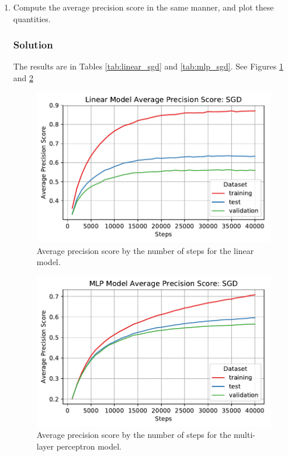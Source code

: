 \documentclass[letterpaper,11pt]{article}
\begin{document}
\begin{enumerate}
\item Compute the average precision score in the same manner, and plot these
  quantities.

  \subsubsection*{Solution}

  The results are in Tables \ref{tab:linear_sgd} and \ref{tab:mlp_sgd}. See
  Figures \ref{fig:linear_average_precision_score_sgd} and
  \ref{fig:mlp_average_precision_score_sgd}
  
  \begin{figure}
    \centering
    \includegraphics{problem4/linear_average_precision_score_sgd.pdf}
    \caption{Average precision score by the number of steps for the linear
      model.}
    \label{fig:linear_average_precision_score_sgd}
  \end{figure}
  
  \begin{figure}
    \centering
    \includegraphics{problem4/mlp_average_precision_score_sgd.pdf}
    \caption{Average precision score by the number of steps for the multi-layer
      perceptron model.}
    \label{fig:mlp_average_precision_score_sgd}
  \end{figure}


\end{enumerate}
\end{document}
